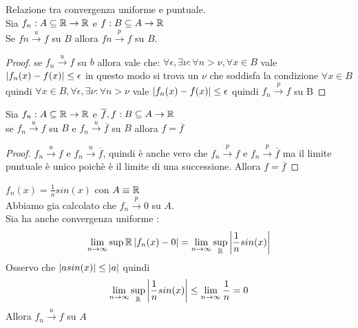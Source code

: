 \proposition Relazione tra convergenza uniforme e puntuale.\\
Sia $f_n:A\subseteq \mathbb{R}\to \mathbb{R}$ e $f:B\subseteq A\to \mathbb{R}$\\
Se $fn\overset{u}{\to}f$ su $B$ allora $fn\overset{p}{\to}f$ su $B$.
\begin{proof}
	se $f_n\overset{u}{\to}f$ su $b$ allora vale che:
	$\forall\epsilon, \exists\nu : \forall n>\nu, \forall x\in B $ vale $\left|f_n(x)-f(x)\right|\le\epsilon$ in questo modo si trova un $\nu$ che soddisfa la condizione $\forall x \in B$ quindi $\forall x\in B, \forall\epsilon, \exists\nu : \forall n>\nu $ vale $\left|f_n(x)-f(x)\right|\le\epsilon$ quindi $f_n\overset{p}{\to}f$ su B
\end{proof}
\proposition
Sia $f_n:A\subseteq \mathbb{R}\to \mathbb{R}$ e $\overline{f},f:B\subseteq A\to \mathbb{R}$\\
se $f_n\overset{u}{\to}f$ su $B$ e $f_n\overset{u}{\to}\overline{f}$ su $B$ allora $f=\overline{f}$
\begin{proof}
	$f_n\overset{u}{\to}f$ e $f_n\overset{u}{\to}\overline{f}$, quindi è anche vero che $f_n\overset{p}{\to}f$ e $f_n\overset{p}{\to}\overline{f}$ ma il limite puntuale è unico poichè è il limite di una successione. Allora $f=\overline{f}$
\end{proof}
\example $f_n(x)=\frac{1}{n}sin(x)$ con $A\equiv \mathbb{R}$\\
Abbiamo gia calcolato che $f_n\overset{p}{\to}0$ su $A$.\\
Sia ha anche convergenza uniforme :\\
$$\lim\limits_{n\to\infty}\sup{ \mathbb{R}}\left|f_n(x)-0\right| = \lim\limits_{n\to\infty}\sup\limits_{ \mathbb{R}}\left|\frac{1}{n}sin(x)\right|$$
Osservo che $\left|asin(x)\right|\le\left|a\right|$ quindi 
$$\lim\limits_{n\to\infty}\sup\limits_{ \mathbb{R}}\left|\frac{1}{n}sin(x)\right|\le\lim\limits_{n\to\infty}\frac{1}{n}=0$$
Allora $f_n\overset{u}{\to}f$ su $A$

